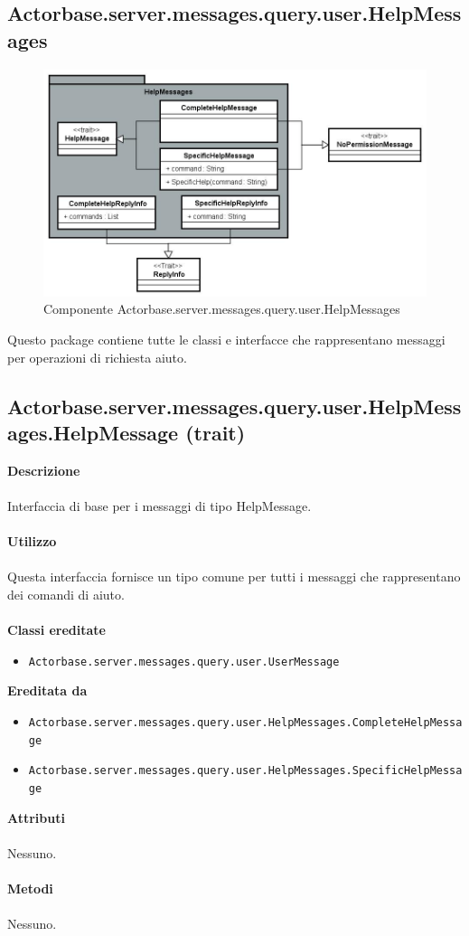 \documentclass[a4paper]{article}
\begin{document}
		\subsection{Actorbase.server.messages.query.user.HelpMessages}
	 \begin{figure}[H]
				\centering
				\includegraphics[width=\textwidth]{Server/helpMessagesLevel.jpg}
				\caption{Componente Actorbase.server.messages.query.user.HelpMessages}
			\end{figure}
		Questo package contiene tutte le classi e interfacce che rappresentano messaggi per operazioni di richiesta aiuto.
		
	\subsection{Actorbase.server.messages.query.user.HelpMessages.HelpMessage (trait)}
		\textbf{Descrizione}
			\\ \\
			Interfaccia di base per i messaggi di tipo HelpMessage.
			\\ \\
		\textbf{Utilizzo}
			\\ \\
			Questa interfaccia fornisce un tipo comune per tutti i messaggi che rappresentano dei comandi di aiuto.
			\\ \\
		\textbf{Classi ereditate}
			\begin{itemize}
				\item \texttt{Actorbase.server.messages.query.user.UserMessage}
			\end{itemize}
		\textbf{Ereditata da}
			\begin{itemize}
				\item \texttt{Actorbase.server.messages.query.user.HelpMessages.CompleteHelpMessage}
				\item \texttt{Actorbase.server.messages.query.user.HelpMessages.SpecificHelpMessage}				
			\end{itemize}
		\textbf{Attributi}
			\\ \\
			Nessuno.
			\\ \\
		\textbf{Metodi}
			\\ \\
			Nessuno.	
			
\end{document}
